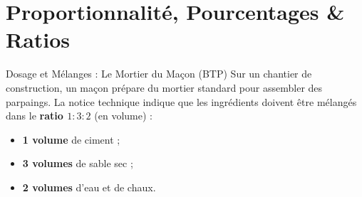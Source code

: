 \chapter{Proportionnalité, Pourcentages \& Ratios}

\begin{activite}{Dosage et Mélanges : Le Mortier du Maçon (BTP)}
Sur un chantier de construction, un maçon prépare du mortier standard pour assembler des parpaings.
La notice technique indique que les ingrédients doivent être mélangés dans le \textbf{ratio $1 : 3 : 2$} (en volume) :
\begin{itemize}
    \item \textbf{1 volume} de ciment ;
    \item \textbf{3 volumes} de sable sec ;
    \item \textbf{2 volumes} d'eau et de chaux.
\end{itemize}

\begin{center}
\end{center}


\end{activite}
